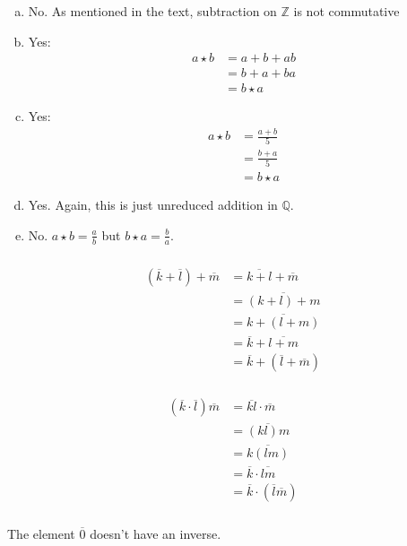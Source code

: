 \documentclass{article}
\newcommand{\ints}{\mathbb{Z}}
\newcommand{\rats}{\mathbb{Q}}
\newcommand{\mult}{\star}
\renewcommand{\bar}{\overline}
\begin{document}
\subsubsection{}
\begin{enumerate}[(a)]
\item No. As mentioned in the text, subtraction on $\ints$ is not commutative
\item Yes:
\begin{align*}
a\mult b &= a+b+ab\\
&= b + a +ba\\
&= b\mult a
\end{align*}
\item Yes:
\begin{align*}
a\mult b &= \frac{a+b}{5}\\
&= \frac{b+a}{5}\\
&= b\mult a
\end{align*}
\item Yes. Again, this is just unreduced addition in $\rats$. 
\item No. $a \mult b = \frac{a}{b}$ but $b \mult a = \frac{b}{a}$.
\end{enumerate}
\subsubsection{}
\begin{align*}
(\bar k + \bar l) + \bar m 
&= \bar{k+l} + \bar m\\
&= \bar{(k+l)+m}\\
&= \bar{k+(l+m)}\\
&= \bar k + \bar{l+m}\\
&= \bar k + (\bar l + \bar m)
\end{align*}
\subsubsection{}
\begin{align*}
(\bar k \cdot \bar l) \bar m 
&= \bar{kl} \cdot \bar m\\
&= \bar{(kl)m}\\
&= \bar{k(lm)}\\
&= \bar k \cdot \bar{lm}\\
&= \bar k \cdot (\bar l  \bar m)
\end{align*}
\subsubsection{}
The element $\bar 0$ doesn't have an inverse.
\end{document}
